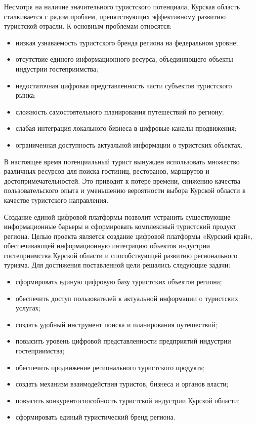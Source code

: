 Несмотря на наличие значительного туристского потенциала, Курская область сталкивается с рядом проблем, препятствующих эффективному развитию туристской отрасли.
К основным проблемам относятся:
\begin{itemize}
\item низкая узнаваемость туристского бренда региона на федеральном уровне;
\item отсутствие единого информационного ресурса, объединяющего объекты индустрии гостеприимства;
\item недостаточная цифровая представленность части субъектов туристского рынка;
\item сложность самостоятельного планирования путешествий по региону;
\item слабая интеграция локального бизнеса в цифровые каналы продвижения;
\item ограниченная доступность актуальной информации о туристских объектах.
\end{itemize}

В настоящее время потенциальный турист вынужден использовать множество различных ресурсов для поиска гостиниц, ресторанов, маршрутов и достопримечательностей. Это приводит к потере времени, снижению качества пользовательского опыта и уменьшению вероятности выбора Курской области в качестве туристского направления.

Создание единой цифровой платформы позволит устранить существующие информационные барьеры и сформировать комплексный туристский продукт региона.
Целью проекта является создание цифровой платформы «Курский край», обеспечивающей информационную интеграцию объектов индустрии гостеприимства Курской области и способствующей развитию регионального туризма.
Для достижения поставленной цели решались следующие задачи:
\begin{itemize}
\item сформировать единую цифровую базу туристских объектов региона;
\item обеспечить доступ пользователей к актуальной информации о туристских услугах;
\item создать удобный инструмент поиска и планирования путешествий;
\item повысить уровень цифровой представленности предприятий индустрии гостеприимства;
\item обеспечить продвижение регионального туристского продукта;
\item создать механизм взаимодействия туристов, бизнеса и органов власти;
\item повысить конкурентоспособность туристской индустрии Курской области;
\item сформировать единый туристический бренд региона.
\end{itemize}

